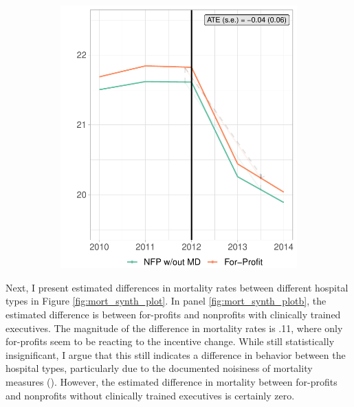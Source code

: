 \documentclass[12pt]{article}
\begin{document}
\begin{figure}[ht!]
\begin{subfigure}[b]{0.45\textwidth}
         \includegraphics[width=\textwidth]{Objects/read_fp_nomd_synth_graph.pdf}
         \label{fig:read_synth_plotc}
     \end{subfigure}
        \label{fig:read_synth_plot}
    \end{figure}

    

    Next, I present estimated differences in mortality rates between different hospital types in Figure \ref{fig:mort_synth_plot}. In panel \ref{fig:mort_synth_plotb}, the estimated difference is between for-profits and nonprofits with clinically trained executives. The magnitude of the difference in mortality rates is .11, where only for-profits seem to be reacting to the incentive change. While still statistically insignificant, I argue that this still indicates a difference in behavior between the hospital types, particularly due to the documented noisiness of mortality measures (\cite{mackenzie2016measuring}). However, the estimated difference in mortality between for-profits and nonprofits without clinically trained executives is certainly zero. 
\end{document}
